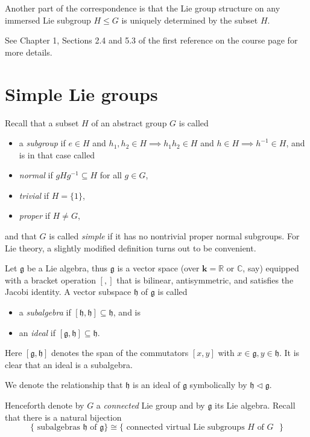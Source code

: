 \documentclass[reqno]{amsart} 
\begin{document}
Another part of the correspondence is that the Lie group structure on any immersed Lie subgroup $H \leq G$ is uniquely determined by the subset $H$.

See Chapter 1, Sections 2.4 and 5.3 of the first reference on the course page for more details.

\section{Simple Lie groups}
\label{sec:org0fe80c3}
Recall that a subset $H$ of an abstract group $G$ is called
\begin{itemize}
\item a \emph{subgroup} if $e \in H$ and $h_1,h_2 \in H \implies h_1 h_2 \in H$ and $h \in H \implies h^{-1} \in H$, and is in that case called
\item \emph{normal} if $g H g^{-1} \subseteq H$ for all $g \in G$,
\item \emph{trivial} if $H = \{1\}$,
\item \emph{proper} if $H \neq G$,
\end{itemize}
and that $G$ is called \emph{simple} if it has no nontrivial proper normal subgroups.  For Lie theory, a slightly modified definition turns out to be convenient.
\begin{definition}
  Let $\mathfrak{g}$ be a Lie algebra, thus $\mathfrak{g}$ is a vector space (over $\mathbf{k} = \mathbb{R}$ or $\mathbb{C}$, say) equipped with a bracket operation $[,]$ that is bilinear, antisymmetric, and satisfies the Jacobi identity.  A vector subspace $\mathfrak{h}$ of $\mathfrak{g}$ is called
  \begin{itemize}
  \item a \emph{subalgebra} if $[\mathfrak{h},\mathfrak{h}] \subseteq \mathfrak{h}$, and is
  \item an \emph{ideal} if $[\mathfrak{g},\mathfrak{h}] \subseteq \mathfrak{h}$.
  \end{itemize}
  Here $[\mathfrak{g},\mathfrak{h}]$ denotes the span of the commutators $[x,y]$ with $x \in \mathfrak{g}, y \in \mathfrak{h}$.  It is clear that an ideal is a subalgebra.

  We denote the relationship that $\mathfrak{h}$ is an ideal of $\mathfrak{g}$ symbolically by $\mathfrak{h} \triangleleft \mathfrak{g}$.
\end{definition}
Henceforth denote by $G$ a \emph{connected} Lie group and by $\mathfrak{g}$ its Lie algebra.  Recall that there is a natural bijection
\begin{equation*}
  \{ \text{ subalgebras } \mathfrak{h} \text{ of } \mathfrak{g} \} \cong \{ \text{ connected virtual Lie subgroups $H$ of $G$ } \}
\end{equation*}
\end{document}
